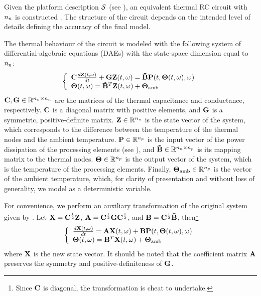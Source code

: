 Given the platform description $\mathcal{S}$ (see ), an equivalent thermal RC circuit with ${n_n}$  is constructed \cite{kreith2000}. The structure of the circuit depends on the intended level of details defining the accuracy of the final model.

The thermal behaviour of the circuit is modeled with the following system of differential-algebraic equations (DAEs) with the state-space dimension equal to ${n_n}$:
\begin{align} \elabel{fourier-original}
  \left\{
    \begin{array}{l}
      \mC \frac{d\vTI(\t, \o)}{d\t} + \mG \vTI(\t, \o) = \mM \vP(\t, \vTO(\t, \o), \o) \\
      \vTO(\t, \o) = \mM^T \vTI(\t, \o) + \vTO_\amb
    \end{array}
  \right.
\end{align}
$\mC, \mG \in \real^{\nodes \times \nodes}$ are the matrices of the thermal capacitance and conductance, respectively. $\mC$ is a diagonal matrix with positive elements, and $\mG$ is a symmetric, positive-definite matrix. $\mathbf{Z} \in \mathbb{R}^{n_n}$ is the state vector of the system, which corresponds to the difference between the temperature of the thermal nodes and the ambient temperature. $\mathbf{P} \in \mathbb{R}^{n_p}$ is the input vector of the power dissipation of the processing elements (see ), and $\mM \in \real^{\nodes \times \cores}$ is its mapping matrix to the thermal nodes. ${\boldsymbol\Theta} \in \mathbb{R}^{n_p}$ is the output vector of the system, which is the temperature of the processing elements. Finally, ${\boldsymbol\Theta}_{\text{amb}} \in \mathbb{R}^{n_p}$ is the vector of the ambient temperature, which, for clarity of presentation and without loss of generality, we model as a deterministic variable.

For convenience, we perform an auxiliary transformation \cite{ukhov2012} of the original system given by . Let $\vX = \mC^\frac{1}{2} \vTI$, $\mA = \mC^\frac{1}{2} \mG \mC^\frac{1}{2}$, and $\mB = \mC^\frac{1}{2} \mM$, then\footnote{Since $\mC$ is diagonal, the transformation is cheat to undertake.}
\begin{align} \elabel{fourier}
  \left\{
    \begin{array}{l}
      \frac{d\vX(\t, \o)}{d\t} = \mA \vX(\t, \o) + \mB \vP(\t, \vTO(\t, \o), \o) \\
      \vTO(\t, \o) = \mB^T \vX(\t, \o) + \vTO_\amb
    \end{array}
  \right.
\end{align}
where $\mathbf{X}$ is the new state vector. It should be noted that the coefficient matrix $\mA$ preserves the  symmetry and positive-definiteness of $\mG$.
